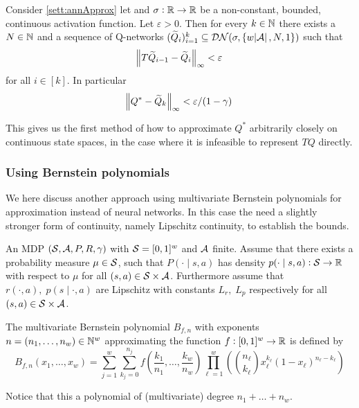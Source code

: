 \begin{prop}
  Consider \cref{sett:annApprox} let
  and $\sigma : \mathbb{R} \to \mathbb{R}$ be a non-constant, bounded, continuous
  activation function. Let $\varepsilon > 0$.
  Then for every $k \in \mathbb{N}$ there exists a $N\in \mathbb{N}$ and a sequence of
  Q-networks $(\widetilde{Q}_i)_{i=1}^k \subseteq \mathcal{DN}(\sigma,
  \{w \abs{\mathcal{A}}, N, 1\})$ such that
  \[ \norm{T\widetilde{Q}_{i-1} - \widetilde{Q}_i}_\infty < \varepsilon \]
  for all $i \in [k]$.
  In particular
  \[ \norm{Q^* - \widetilde{Q}_k}_\infty < \varepsilon/(1 - \gamma) \]
\end{prop}

This gives us the first method of how to approximate
$Q^*$ arbitrarily closely on continuous state spaces, in the case
where it is infeasible to represent $TQ$ directly.

\subsubsection{Using Bernstein polynomials}

We here discuss another approach using multivariate Bernstein polynomials
for approximation instead of neural networks.
In this case the need a slightly stronger form of continuity, namely
Lipschitz continuity, to establish the bounds.

\begin{sett}
  An MDP $(\mathcal{S}, \mathcal{A}, P, R, \gamma)$ with
  $\mathcal{S} = [0,1]^w$ and $\mathcal{A}$ finite.
  Assume that there exists a probability measure $\mu \in \mathcal{S}$, such that
  $P(\cdot \mid s, a)$ has density
  $p(\cdot \mid s, a) : \mathcal{S} \to \mathbb{R}$ with respect to
  $\mu$ for all $(s, a) \in \mathcal{S}\times\mathcal{A}$. 
  Furthermore assume that $r(\cdot, a), \; p(s \mid \cdot, a)$ are
  Lipschitz
  with constants $L_r,\; L_p$ respectively for all
  $(s, a) \in \mathcal{S} \times \mathcal{A}$.
  \label{sett:polyApprox}
\end{sett}

\begin{defn}
  The multivariate Bernstein polynomial $B_{f, n}$ with exponents
  $n=(n_1, \dots, n_w) \in \mathbb{N}^w$ approximating the function $f:[0,1]^w \to \mathbb{R}$
  is defined by
  \begin{equation*}
    B_{f, n}(x_1, \dots, x_w) =
    \sum_{j = 1}^w \sum_{k_j = 0}^{n_j}
    f\left( \frac{k_1}{n_1}, \dots, \frac{k_w}{n_w} \right)
    \prod_{\ell = 1}^w \left(
    \binom{n_\ell}{k_\ell} x_\ell^{k_\ell}(1-x_\ell)^{n_\ell - k_\ell} \right)
  \end{equation*}
  \label{defn:Bfn}
\end{defn}
Notice that this a polynomial of (multivariate) degree $n_1 + \dots + n_w$.

